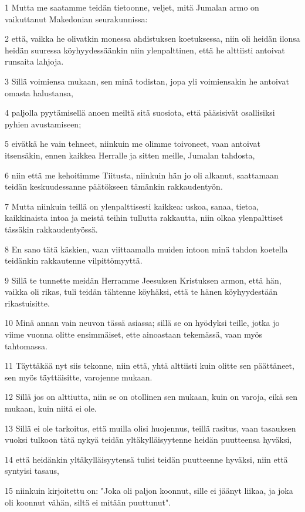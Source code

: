 \par 1 Mutta me saatamme teidän tietoonne, veljet, mitä Jumalan armo on vaikuttanut Makedonian seurakunnissa:
\par 2 että, vaikka he olivatkin monessa ahdistuksen koetuksessa, niin oli heidän ilonsa heidän suuressa köyhyydessäänkin niin ylenpalttinen, että he alttiisti antoivat runsaita lahjoja.
\par 3 Sillä voimiensa mukaan, sen minä todistan, jopa yli voimiensakin he antoivat omasta halustansa,
\par 4 paljolla pyytämisellä anoen meiltä sitä suosiota, että pääsisivät osallisiksi pyhien avustamiseen;
\par 5 eivätkä he vain tehneet, niinkuin me olimme toivoneet, vaan antoivat itsensäkin, ennen kaikkea Herralle ja sitten meille, Jumalan tahdosta,
\par 6 niin että me kehoitimme Tiitusta, niinkuin hän jo oli alkanut, saattamaan teidän keskuudessanne päätökseen tämänkin rakkaudentyön.
\par 7 Mutta niinkuin teillä on ylenpalttisesti kaikkea: uskoa, sanaa, tietoa, kaikkinaista intoa ja meistä teihin tullutta rakkautta, niin olkaa ylenpalttiset tässäkin rakkaudentyössä.
\par 8 En sano tätä käskien, vaan viittaamalla muiden intoon minä tahdon koetella teidänkin rakkautenne vilpittömyyttä.
\par 9 Sillä te tunnette meidän Herramme Jeesuksen Kristuksen armon, että hän, vaikka oli rikas, tuli teidän tähtenne köyhäksi, että te hänen köyhyydestään rikastuisitte.
\par 10 Minä annan vain neuvon tässä asiassa; sillä se on hyödyksi teille, jotka jo viime vuonna olitte ensimmäiset, ette ainoastaan tekemässä, vaan myös tahtomassa.
\par 11 Täyttäkää nyt siis tekonne, niin että, yhtä alttiisti kuin olitte sen päättäneet, sen myös täyttäisitte, varojenne mukaan.
\par 12 Sillä jos on alttiutta, niin se on otollinen sen mukaan, kuin on varoja, eikä sen mukaan, kuin niitä ei ole.
\par 13 Sillä ei ole tarkoitus, että muilla olisi huojennus, teillä rasitus, vaan tasauksen vuoksi tulkoon tätä nykyä teidän yltäkylläisyytenne heidän puutteensa hyväksi,
\par 14 että heidänkin yltäkylläisyytensä tulisi teidän puutteenne hyväksi, niin että syntyisi tasaus,
\par 15 niinkuin kirjoitettu on: "Joka oli paljon koonnut, sille ei jäänyt liikaa, ja joka oli koonnut vähän, siltä ei mitään puuttunut".
